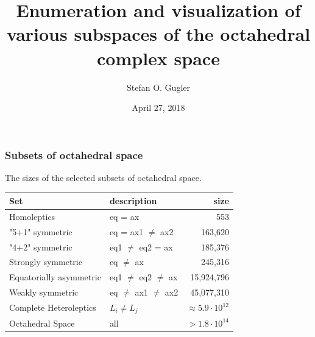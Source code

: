 \documentclass[xcolor=dvipsnames]{beamer}
\title[Meeting 2]{Enumeration and visualization of various subspaces of the octahedral complex space}
\date{April 27, 2018}
\author[Stefan O. Gugler]
{Stefan O. Gugler}
\institute[MIT]{Massachusetts Institute of Technology  \\Department of Chemical Engineering}
\begin{document}
	
\begin{frame}
	\titlepage
\end{frame}
%


\begin{frame}
\frametitle{Subsets of octahedral space}
The sizes of the selected subsets of octahedral space.
\begin{table}[]
	\centering
	\label{tab:space-sizes}
	\begin{tabular}{llr}
		\toprule
		Set 					& description		    	   & size \\
		\midrule
		Homoleptics             & eq = ax                   & 553        \\[0.1cm]
		"5+1" symmetric         & eq = ax1 $\neq$ ax2       & 163,620    \\[0.1cm]
		"4+2" symmetric         & eq1 $\neq$ eq2 = ax       & 185,376    \\[0.1cm]
		Strongly symmetric      & eq $\neq$ ax              & 245,316    \\[0.1cm]
		Equatorially asymmetric & eq1 $\neq$ eq2 $\neq$ ax  & 15,924,796 \\[0.1cm]
		Weakly symmetric        & eq $\neq$ ax1 $\neq$ ax2  & 45,077,310 \\[0.1cm]
		Complete Heteroleptics  & $L_i \neq L_j$            & $\approx 5.9 \cdot 10^{12}$ \\[0.1cm] %
		Octahedral Space        & all                       & $> 1.8 \cdot 10^{14}$ \\
		\bottomrule
	\end{tabular}
	\end{table}
\end{frame}
\end{document}
